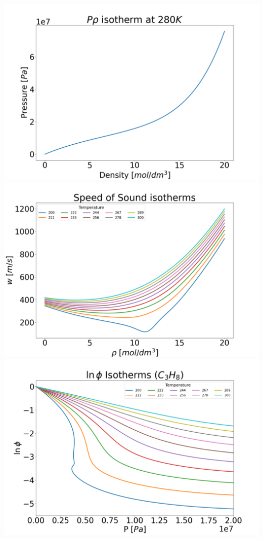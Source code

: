\documentclass[a0,portrait]{a0poster}
\begin{document}
\begin{multicols}{2}
\begin{multicols}{2}
\includegraphics[width=17cm]{isotherm.png}
\includegraphics[width=17cm]{ss.png}
\includegraphics[width=17cm]{lnfug.png}


\end{multicols}
\end{multicols}
\end{document}

